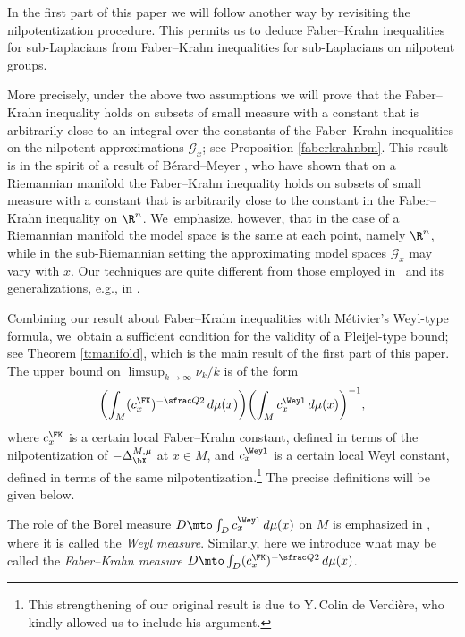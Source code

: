 In the first part of this paper we will follow another way by revisiting the nilpotentization procedure. This permits us to deduce Faber--Krahn inequalities for sub-Laplacians from Faber--Krahn inequalities for sub-Laplacians on nilpotent groups.

More precisely, under the above two assumptions we will prove that the Faber--Krahn inequality holds on subsets of small measure with a constant that is arbitrarily close to an integral over the constants of the Faber--Krahn inequalities on the nilpotent approximations $\mathcal G_x$; see Proposition \ref{faberkrahnbm}. This result is in the spirit of a result of Bérard--Meyer \cite[Part\,II, Lem.\,16]{BerMe}, who have shown that on a Riemannian manifold the Faber--Krahn inequality holds on subsets of small measure with a constant that is arbitrarily close to the constant in the Faber--Krahn inequality on $\R^n$. We~emphasize, however, that in the case of a Riemannian manifold the model space is the same at each point, namely $\R^n$, while in the sub-Riemannian setting the approximating model spaces $\mathcal G_x$ may vary with $x$. Our techniques are quite different from those employed in~\cite{BerMe} and its generalizations, e.g., in \cite{DFV}.

Combining our result about Faber--Krahn inequalities with Métivier's Weyl-type formula, we~obtain a sufficient condition for the validity of a Pleijel-type bound; see Theorem \ref{t:manifold}, which is the main result of the first part of this paper. The upper bound on $\limsup_{k\to\infty} \nu_k/k$ is of the form\enlargethispage{\baselineskip}
\begin{equation}
\label{eq:mainintro}
\biggl(\int_M (c_x^\FK)^{-\sfrac Q2} \,d\mu(x) \biggr) \biggl(\int_M c_x^\Weyl\,d\mu(x) \biggr)^{-1},
\end{equation}
where $c_x^\FK$ is a certain local Faber--Krahn constant, defined in terms of the nilpotentization of $-\Delta_\bX^{M,\mu}$ at $x\in M$, and $c_x^\Weyl$ is a certain local Weyl constant, defined in terms of the same nilpotentization.\footnote{This strengthening of our original result \cite{FrHe1,FrHe2} is due to Y.\,Colin de Verdière, who kindly allowed us to include his argument.} The precise definitions will be given below.

The role of the Borel measure $D\mto \int_D c_x^\Weyl\,d\mu(x)$ on $M$ is emphasized in \cite{CHT1}, where it is called the \emph{Weyl measure}. Similarly, here we introduce what may be called the \emph{Faber--Krahn measure} $D\mto \int_D (c_x^\FK)^{-\sfrac Q2} \,d\mu(x)$.

